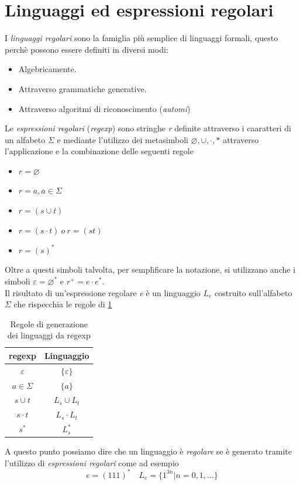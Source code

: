 \section{Linguaggi ed espressioni regolari}
I \emph{linguaggi regolari} sono la famiglia più semplice di linguaggi formali, questo perchè possono essere definiti in diversi modi:
\begin{itemize}
	\item Algebricamente.
	\item Attraverso grammatiche generative.
	\item Attraverso algoritmi di riconoscimento (\emph{automi})
\end{itemize}
Le \emph{espressioni regolari} (\emph{regexp}) sono stringhe \emph{r} definite attraverso i caaratteri di un alfabeto $ \Sigma $ e mediante l'utilizzo dei metasimboli $ \varnothing, \cup, \cdot, \ast $ attraverso l'applicazione e la combinazione delle seguenti regole
\begin{itemize}
	\item $ r= \varnothing $
	\item $ r = a, a\in \Sigma $
	\item $ r = (s \cup t) $
	\item $ r = (s\cdot t) \ o \ r = (st) $
	\item $ r = (s)^\ast $
\end{itemize}
Oltre a questi simboli talvolta, per semplificare la notazione, si utilizzano anche i simboli $ \varepsilon = \varnothing^\ast$ e $ r^+ = e\cdot e^\ast $.\\
Il risultato di un'espressione regolare \emph{e} è un linguaggio $ L_e $ costruito sull'alfabeto $ \Sigma $ che rispecchia le regole di \tablename\ref{tab:reggen}
\begin{table}
	\centering
\begin{tabular}{|c|c|}
	\hline \textbf{regexp} & \textbf{Linguaggio} \\ 
	\hline $ \varepsilon $ & $ \{\varepsilon\} $ \\ 
	\hline $ a\in\Sigma $ & $ \{a\} $ \\ 
	\hline $ s\cup t $ & $ L_s \cup L_t $ \\ 
	\hline $ s\cdot t $ & $ L_s\cdot L_t $ \\ 
	\hline $ s^\ast $ & $ L_s^\ast $ \\ 
	\hline 
\end{tabular}
\caption{Regole di generazione dei linguaggi da regexp}\label{tab:reggen}
\end{table}
A questo punto possiamo dire che un linguaggio è \emph{regolare} se è generato tramite l'utilizzo di \emph{espressioni regolari} come ad esempio
$$ e = (111)^* \quad L_e=\{1^{3n}|n = 0,1,\dots \} $$
